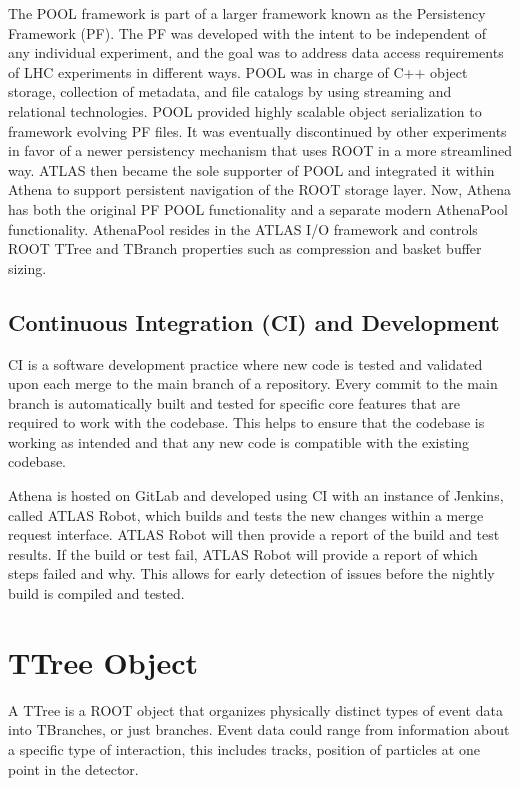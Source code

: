 The POOL framework is part of a larger framework known as the Persistency Framework (PF). \cite{Trentadue_2012}
The PF was developed with the intent to be independent of any individual experiment, and the goal was to address data access requirements of LHC experiments in different ways.
POOL was in charge of C++ object storage, collection of metadata, and file catalogs by using streaming and relational technologies. 
POOL provided highly scalable object serialization to framework evolving PF files. 
It was eventually discontinued by other experiments in favor of a newer persistency mechanism that uses ROOT in a more streamlined way.
ATLAS then became the sole supporter of POOL and integrated it within Athena to support persistent navigation of the ROOT storage layer.
Now, Athena has both the original PF POOL functionality and a separate modern AthenaPool functionality. 
AthenaPool resides in the ATLAS I/O framework and controls ROOT TTree and TBranch properties such as compression and basket buffer sizing.


\subsection{Continuous Integration (CI) and Development}
CI is a software development practice where new code is tested and validated upon each merge to the main branch of a repository. 
Every commit to the main branch is automatically built and tested for specific core features that are required to work with the codebase. 
This helps to ensure that the codebase is working as intended and that any new code is compatible with the existing codebase.

Athena is hosted on GitLab and developed using CI with an instance of Jenkins, called ATLAS Robot, which builds and tests the new changes within a merge request interface. 
ATLAS Robot will then provide a report of the build and test results.
If the build or test fail, ATLAS Robot will provide a report of which steps failed and why.
This allows for early detection of issues before the nightly build is compiled and tested.



\section{TTree Object} \label{section: ATLASIO_TTreeObject}
A TTree is a ROOT object that organizes physically distinct types of event data into TBranches, or just branches.
Event data could range from information about a specific type of interaction, this includes tracks, position of particles at one point in the detector. 

